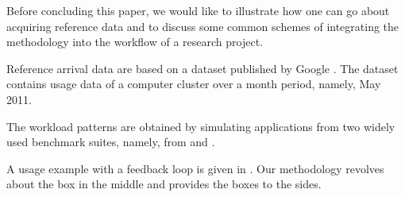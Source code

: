 

Before concluding this paper, we would like to illustrate how one can go about
acquiring reference data and to discuss some common schemes of integrating the
methodology into the workflow of a research project.

Reference arrival data are based on a dataset published by Google \cite{google}.
The dataset contains usage data of a computer cluster over a month period,
namely, May 2011.

The workload patterns are obtained by simulating applications from two widely
used benchmark suites, namely, from  \cite{bienia2011} and  \cite{cpu2006}.

A usage example with a feedback loop is given in . Our methodology
revolves about the box in the middle and provides the boxes to the sides.
